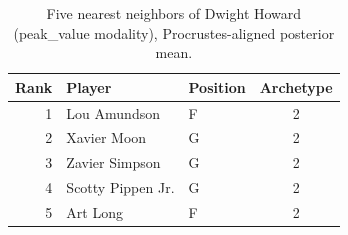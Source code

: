 \begin{table}[htbp]
  \centering\small
  \begin{tabular}{rllc}
    \toprule
    Rank & Player & Position & Archetype \\
    \midrule
    1 & Lou Amundson & F & 2 \\
    2 & Xavier Moon & G & 2 \\
    3 & Zavier Simpson & G & 2 \\
    4 & Scotty Pippen Jr. & G & 2 \\
    5 & Art Long & F & 2 \\
    \bottomrule
  \end{tabular}
  \caption{Five nearest neighbors of Dwight Howard (peak_value modality), Procrustes-aligned posterior mean.}
  \label{tab:Dwight_Howard_neighbors_peak_value}
\end{table}

